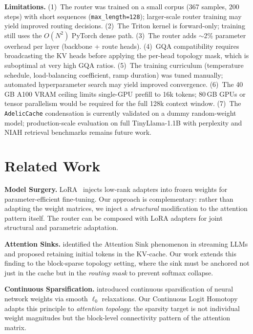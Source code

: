 \documentclass[11pt,a4paper]{article}
\begin{document}
\textbf{Limitations.} (1)~The router was trained on a small corpus (367 samples, 200 steps) with short sequences (\texttt{max\_length=128}); larger-scale router training may yield improved routing decisions. (2)~The Triton kernel is forward-only; training still uses the $O(N^2)$ PyTorch dense path. (3)~The router adds $\sim$2\% parameter overhead per layer (backbone + route heads). (4)~GQA compatibility requires broadcasting the KV heads before applying the per-head topology mask, which is suboptimal at very high GQA ratios. (5)~The training curriculum (temperature schedule, load-balancing coefficient, ramp duration) was tuned manually; automated hyperparameter search may yield improved convergence. (6)~The 40\,GB A100 VRAM ceiling limits single-GPU prefill to 16k tokens; 80\,GB GPUs or tensor parallelism would be required for the full 128k context window. (7)~The \texttt{AdelicCache} condensation is currently validated on a dummy random-weight model; production-scale evaluation on full TinyLlama-1.1B with perplexity and NIAH retrieval benchmarks remains future work.

\section{Related Work}

\textbf{Model Surgery.} LoRA~\citep{hu2022lora} injects low-rank adapters into frozen weights for parameter-efficient fine-tuning. Our approach is complementary: rather than adapting the weight matrices, we inject a \emph{structural} modification to the attention pattern itself. The router can be composed with LoRA adapters for joint structural and parametric adaptation.

\textbf{Attention Sinks.} \citet{xiao2023efficient} identified the Attention Sink phenomenon in streaming LLMs and proposed retaining initial tokens in the KV-cache. Our work extends this finding to the block-sparse topology setting, where the sink must be anchored not just in the cache but in the \emph{routing mask} to prevent softmax collapse.

\textbf{Continuous Sparsification.} \citet{savarese2020winning} introduced continuous sparsification of neural network weights via smooth $\ell_0$ relaxations. Our Continuous Logit Homotopy adapts this principle to \emph{attention topology}: the sparsity target is not individual weight magnitudes but the block-level connectivity pattern of the attention matrix.
\end{document}
